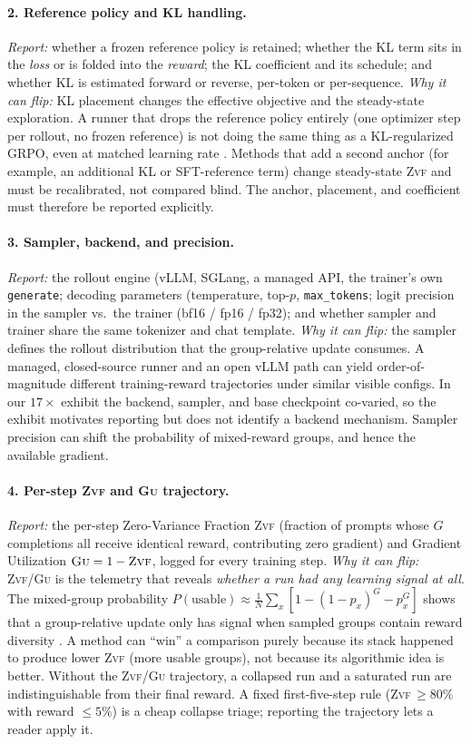 \documentclass[11pt]{article}
\newcommand{\zvf}{\textsc{Zvf}}
\newcommand{\gu}{\textsc{Gu}}
\begin{document}
\paragraph{2. Reference policy and KL handling.}
\emph{Report:} whether a frozen reference policy is retained; whether the KL
term sits in the \emph{loss} or is folded into the \emph{reward}; the KL
coefficient and its schedule; and whether KL is estimated forward or reverse,
per-token or per-sequence. \emph{Why it can flip:} KL placement changes the
effective objective and the steady-state exploration. A runner that drops the
reference policy entirely (one optimizer step per rollout, no frozen reference)
is not doing the same thing as a KL-regularized GRPO, even at matched learning
rate \cite{zvfaudit2026}. Methods that add a second anchor (for example, an
additional KL or SFT-reference term) change steady-state \zvf{} and must be
recalibrated, not compared blind. The anchor, placement, and coefficient must
therefore be reported explicitly.

\paragraph{3. Sampler, backend, and precision.}
\emph{Report:} the rollout engine (vLLM, SGLang, a managed API, the trainer's
own \texttt{generate}; decoding parameters (temperature, top-$p$,
\texttt{max\_tokens}; logit precision in the sampler vs.\ the trainer (bf16 /
fp16 / fp32); and whether sampler and trainer share the same tokenizer and chat
template. \emph{Why it can flip:} the sampler defines the rollout distribution
that the group-relative update consumes. A managed, closed-source runner and an
open vLLM path can yield order-of-magnitude different training-reward
trajectories under similar visible configs. In our $17\times$ exhibit the
backend, sampler, and base checkpoint co-varied, so the exhibit motivates
reporting but does not identify a backend mechanism. Sampler precision can shift the probability
of mixed-reward groups, and hence the available gradient.

\paragraph{4. Per-step \zvf{} and \gu{} trajectory.}
\emph{Report:} the per-step Zero-Variance Fraction \zvf{} (fraction of prompts
whose $G$ completions all receive identical reward, contributing zero gradient)
and Gradient Utilization $\gu{}=1-\zvf{}$, logged for every training step.
\emph{Why it can flip:} \zvf{}/\gu{} is the telemetry that reveals \emph{whether
a run had any learning signal at all}. The mixed-group probability
$P(\text{usable}) \approx \frac{1}{N}\sum_x\!\left[1-(1-p_x)^G-p_x^G\right]$
shows that a group-relative update only has signal when sampled groups contain
reward diversity \cite{zvfaudit2026}. A method can ``win'' a comparison purely
because its stack happened to produce lower \zvf{} (more usable groups), not
because its algorithmic idea is better. Without the \zvf{}/\gu{} trajectory, a
collapsed run and a saturated run are indistinguishable from their final reward.
A fixed first-five-step rule (\zvf{}$\,\ge 80\%$ with reward $\le 5\%$) is a
cheap collapse triage; reporting the trajectory lets a reader apply it.
\end{document}
